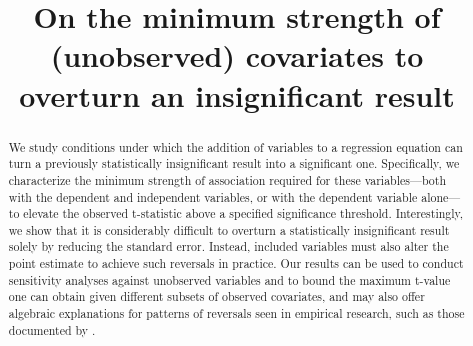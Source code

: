 \documentclass[sts]{imsart}
\theoremstyle{plain}
\theoremstyle{definition}
\begin{document}
\begin{frontmatter}
\title{On the minimum strength of (unobserved) covariates to overturn an insignificant result}


\begin{abstract}
We study conditions under which the addition of variables to a regression equation can turn a previously statistically insignificant result into a significant one. Specifically, we characterize the minimum strength of association required for these variables---both with the dependent and independent variables, or with the dependent variable alone---to elevate the observed \mbox{t-statistic} above a specified significance threshold. 
Interestingly, we show that it is considerably difficult to overturn a statistically insignificant result solely by reducing the standard error.
Instead, included variables  must also alter the point estimate to achieve such reversals in practice. 
Our results can be used to conduct sensitivity analyses against unobserved variables and to bound the maximum t-value one can obtain given different subsets of observed covariates, and may also offer algebraic explanations for  patterns of  reversals seen in empirical research, such as those documented by \cite{lenz2021achieving}.
\end{abstract}

\begin{keyword}
\end{keyword}

\end{frontmatter}
\end{document}
